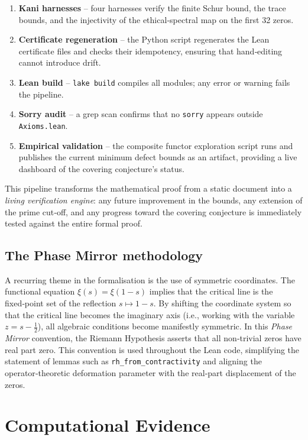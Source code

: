 \documentclass[11pt,reqno]{amsart}
\theoremstyle{definition}
\theoremstyle{remark}
\begin{document}
\begin{enumerate}
\item \textbf{Kani harnesses} – four harnesses verify the finite Schur bound, the trace bounds, and the injectivity of the ethical‑spectral map on the first 32 zeros.
\item \textbf{Certificate regeneration} – the Python script regenerates the Lean certificate files and checks their idempotency, ensuring that hand‑editing cannot introduce drift.
\item \textbf{Lean build} – \texttt{lake build} compiles all modules; any error or warning fails the pipeline.
\item \textbf{Sorry audit} – a grep scan confirms that no \texttt{sorry} appears outside \texttt{Axioms.lean}.
\item \textbf{Empirical validation} – the composite functor exploration script runs and publishes the current minimum defect bounds as an artifact, providing a live dashboard of the covering conjecture's status.
\end{enumerate}

This pipeline transforms the mathematical proof from a static document into a \emph{living verification engine}: any future improvement in the bounds, any extension of the prime cut‑off, and any progress toward the covering conjecture is immediately tested against the entire formal proof.

\subsection{The Phase Mirror methodology}

A recurring theme in the formalisation is the use of symmetric coordinates.  The functional equation \(\xi(s)=\xi(1-s)\) implies that the critical line is the fixed‑point set of the reflection \(s\mapsto 1-s\).  By shifting the coordinate system so that the critical line becomes the imaginary axis (i.e., working with the variable \(z = s-\frac12\)), all algebraic conditions become manifestly symmetric.  In this \emph{Phase Mirror} convention, the Riemann Hypothesis asserts that all non‑trivial zeros have real part zero.  This convention is used throughout the Lean code, simplifying the statement of lemmas such as \texttt{rh\_from\_contractivity} and aligning the operator‑theoretic deformation parameter with the real‑part displacement of the zeros.

\section{Computational Evidence}
\label{sec:computational}
\end{document}
